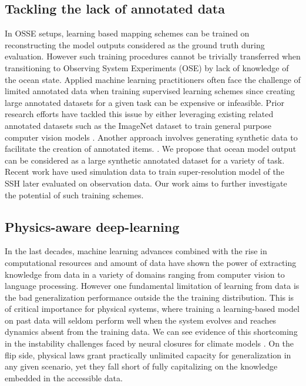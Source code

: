 \begin{bibunit}
\subsection{Tackling the lack of annotated data}
\label{ssec:transferlearning}
In OSSE setups, learning based mapping schemes can be trained on reconstructing the model outputs considered as the ground truth during evaluation. However such training procedures cannot be trivially transferred  when transitioning to Observing System Experiments (OSE) by lack of knowledge of the ocean state.
Applied machine learning practitioners often face the challenge of limited annotated data when training supervised learning schemes since creating large annotated datasets for a given task can be expensive or infeasible.
Prior research efforts have tackled this issue by either leveraging existing related annotated datasets such as the ImageNet\cite{dengImageNetLargescaleHierarchical2009} dataset to train general purpose computer vision models \cite{heDeepResidualLearning2016}. Another approach involves generating synthetic data to facilitate the creation of annotated items. \cite{gomezgonzalezVIPVortexImage2017,dosovitskiyFlowNetLearningOptical2015}.
We propose that ocean model output can be considered as a large synthetic annotated dataset for a variety of task. Recent work have used simulation data to train super-resolution model of the SSH \cite{buongiornonardelliSuperResolvingOceanDynamics2022} later evaluated on observation data. Our work aims to further investigate the potential of such training schemes. 



\subsection{Physics-aware deep-learning}
\label{ssec:deeplearning}
In the last decades, machine learning advances combined with the rise in computational resources and amount of data have shown the power of extracting knowledge from data in a variety of domains ranging from computer vision to language processing. 
However one fundamental limitation of learning from data is the bad generalization performance outside the the training distribution. This is of critical importance for physical systems, where training a learning-based model on past data will seldom perform well when the system evolves and reaches dynamics absent from the training data. We can see evidence of this shortcoming in the instability challenges faced by neural closures for climate models \cite{brenowitzInterpretingStabilizingMachineLearning2020}. 
On the flip side, physical laws grant practically unlimited capacity for generalization in any given scenario, yet they fall short of fully capitalizing on the knowledge embedded in the accessible data.


\end{bibunit}

